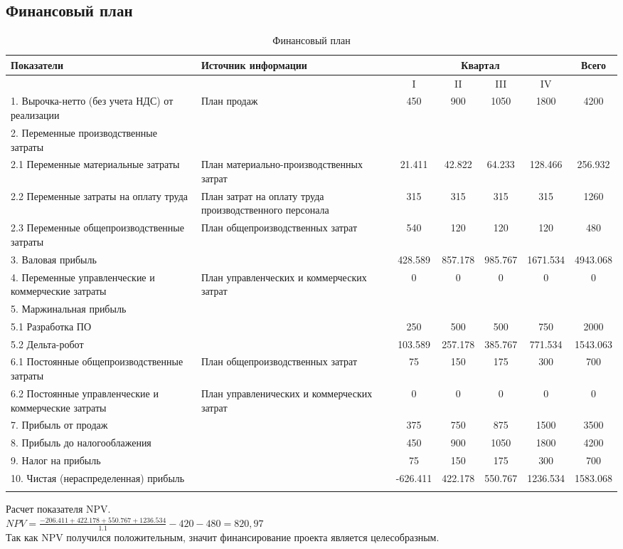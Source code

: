 \subsection{Финансовый план}

\begin{longtable}[c]{|p{110pt}|p{110pt}|c|c|c|c|c|}
\hline
Показатели & Источник информации  &\multicolumn{4}{|c|}{Квартал}   & Всего\\
\hline
& & I & II & III & IV & \\ 
\hline
1. Вырочка-нетто (без учета НДС) от реализации & План продаж  & 450 & 900  & 1050  & 1800  & 4200  \\
\hline
2. Переменные производственные затраты &  &  &  &  &  &  \\
\hline
2.1 Переменные материальные затраты & План материально-производственных затрат  & 21.411 & 42.822  & 64.233  & 128.466  & 256.932  \\
\hline
2.2 Переменные затраты на оплату труда & План затрат на оплату труда производственного персонала   & 315 & 315 & 315 & 315 & 1260 \\
\hline
2.3 Переменные общепроизводственные затраты  & План общепроизводственных затрат  & 540 & 120  & 120  & 120  & 480 \\
\hline
3. Валовая прибыль &  & 428.589 & 857.178  & 985.767 & 1671.534 & 4943.068  \\
\hline
4. Переменные управленческие и коммерческие затраты & План управленческих и коммерческих затрат  & 0  & 0  & 0 & 0 & 0 \\
\hline
5. Маржинальная прибыль &  &  &  &  &  &  \\
\hline
5.1 Разработка ПО  &   & 250  & 500  & 500 & 750  & 2000 \\
\hline
5.2 Дельта-робот &  & 103.589  & 257.178 & 385.767 & 771.534 & 1543.063  \\
\hline
6.1 Постоянные общепроизводственные затраты  & План общепроизводственных затрат  & 75  & 150 & 175  & 300  & 700  \\
\hline
6.2 Постоянные управленческие и коммерческие затраты & План управленических и коммерческих затрат  & 0 & 0 & 0 & 0 & 0 \\
\hline
7. Прибыль от продаж &  & 375  & 750 & 875  & 1500 & 3500  \\
\hline
8. Прибыль до налогооблажения & & 450  & 900 & 1050  & 1800  & 4200  \\
\hline
9. Налог на прибыль &  & 75  &  150  &  175 & 300 & 700 \\
\hline
10. Чистая (нераспределенная) прибыль &  & -626.411  & 422.178 & 550.767 & 1236.534 & 1583.068\\
\hline
\caption{Финансовый план}\label{long}

\end{longtable}


Расчет показателя NPV.\\

$NPV = \frac{-206.411+422.178+550.767+1236.534}{1.1}-420-480= 820,97$\\

Так как NPV получился положительным, значит финансирование проекта является целесобразным.



